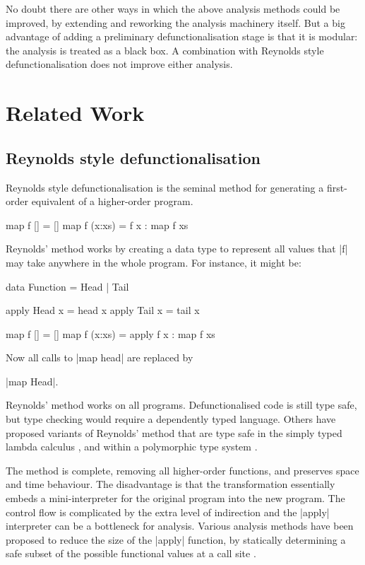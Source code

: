 \documentclass[preprint]{sigplanconf}
\begin{document}
No doubt there are other ways in which the above analysis methods could be improved, by extending and reworking the analysis machinery itself. But a big advantage of adding a preliminary defunctionalisation stage is that it is modular: the analysis is treated as a black box. A combination with Reynolds style defunctionalisation does not improve either analysis.

\section{Related Work}
\label{sec:related}

\subsection{Reynolds style defunctionalisation}

Reynolds style defunctionalisation \cite{reynolds:defunc} is the seminal method for generating a first-order equivalent of a higher-order program.

\begin{example}
\begin{code}
map f []      = []
map f (x:xs)  = f x : map f xs
\end{code}

\noindent Reynolds' method works by creating a data type to represent all values that |f| may take anywhere in the whole program. For instance, it might be:

\ignore\begin{code}
data Function = Head | Tail

apply Head  x = head  x
apply Tail  x = tail  x

map f []      = []
map f (x:xs)  = apply f x : map f xs
\end{code}

\noindent Now all calls to |map head| are replaced by \ignore|map Head|.
\end{example}

Reynolds' method works on all programs. Defunctionalised code is still type safe, but type checking would require a dependently typed language. Others have proposed variants of Reynolds' method that are type safe in the simply typed lambda calculus \cite{bell:type_driven_defunctionalization}, and within a polymorphic type system \cite{pottier:polymorhpic_typed_defunctionaization}.

The method is complete, removing all higher-order functions, and preserves space and time behaviour. The disadvantage is that the transformation essentially embeds a mini-interpreter for the original program into the new program. The control flow is complicated by the extra level of indirection and the |apply| interpreter can be a bottleneck for analysis. Various analysis methods have been proposed to reduce the size of the |apply| function, by statically determining a safe subset of the possible functional values at a call site \cite{cejtin:closure_conversion,grin}.
\end{document}
